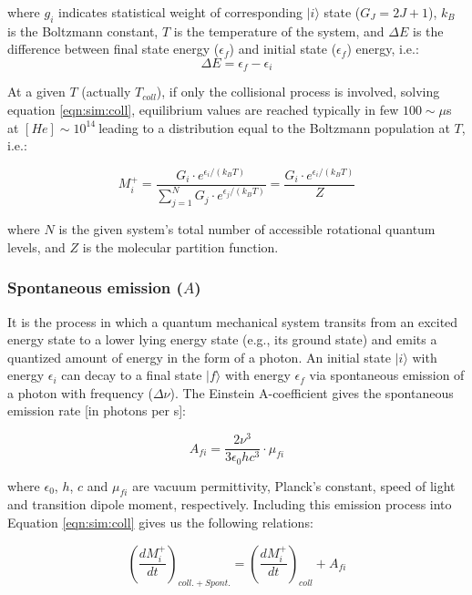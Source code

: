 where $g_i$ indicates statistical weight of corresponding $|i\rangle$ state ($G_J = 2J + 1$), $k_B$ is the Boltzmann constant, $T$ is the temperature of the system, and $\Delta E$ is the difference between final state energy ($\epsilon _f$) and initial state ($\epsilon _f$) energy, i.e.:
\[ \Delta E = \epsilon_f - \epsilon_i \]

At a given $T$ (actually $T_{coll}$), if only the collisional process is involved, solving equation \ref{eqn:sim:coll}, equilibrium values are reached typically in few $100 \sim\mu$s at $[He]\sim 10^{14}\ $\percc leading to a distribution equal to the Boltzmann population at $T$, i.e.:

\begin{equation}
    M^+_i = \frac
        {G_i \cdot e^{\epsilon_i / \left(k_B T \right)}}
        {\sum_{j=1}^{N} G_j \cdot e^{\epsilon_j / \left(k_B T \right)}}
        = \frac{{G_i \cdot e^{\epsilon_i / \left(k_B T \right)}}}{Z}
\end{equation}

where $N$ is the given system's total number of accessible rotational quantum levels, and $Z$ is the molecular partition function.\\ 

\subsubsection{Spontaneous emission (\texorpdfstring{$A$}\ )}
\label{subsec:ROSAA-simulation-spont}

It is the process in which a quantum mechanical system transits from an excited energy state to a lower lying energy state (e.g., its ground state) and emits a quantized amount of energy in the form of a photon. An initial state $|i\rangle$ with energy $\epsilon_i$ can decay to a final state $|f\rangle$ with energy $\epsilon_f$ via spontaneous emission of a photon with frequency ($\Delta \nu$). The Einstein A-coefficient gives the spontaneous emission rate [in photons per s]:

\[ A_{fi} = \frac{2\nu^3}{3\epsilon _0 h c^3} \cdot \mu _{fi}\]

where $\epsilon _0$, $h$, $c$ and $\mu _{fi}$ are vacuum permittivity, Planck's constant, speed of light and transition dipole moment, respectively. Including this emission process into Equation \ref{eqn:sim:coll} gives us the following relations:

\begin{equation}
    \left( \frac{dM^+_i}{dt} \right) _{coll. + Spont.} = \left( \frac{dM^+_i}{dt} \right) _{coll} + A_{fi}
    \label{eqn:sim:spontaneous-lower}
\end{equation}


